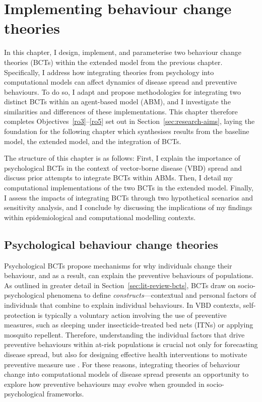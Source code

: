 \section{Implementing behaviour change theories}\label{sec:bcts}

In this chapter, I design, implement, and parameterise two behaviour change theories (BCTs) within the extended model from the previous chapter. Specifically, I address how integrating theories from psychology into computational models can affect dynamics of disease spread and preventive behaviours. To do so, I adapt and propose methodologies for integrating two distinct BCTs within an agent-based model (ABM), and I investigate the similarities and differences of these implementations. This chapter therefore completes Objectives~\ref{ro3}--\ref{ro5} set out in Section~\ref{sec:research-aims}, laying the foundation for the following chapter which synthesises results from the baseline model, the extended model, and the integration of BCTs.

The structure of this chapter is as follows: First, I explain the importance of psychological BCTs in the context of vector-borne disease (VBD) spread and discuss prior attempts to integrate BCTs within ABMs. Then, I detail my computational implementations of the two BCTs in the extended model. Finally, I assess the impacts of integrating BCTs through two hypothetical scenarios and sensitivity analysis, and I conclude by discussing the implications of my findings within epidemiological and computational modelling contexts.

\subsection{Psychological behaviour change theories}

Psychological BCTs propose mechanisms for why individuals change their behaviour, and as a result, can explain the preventive behaviours of populations. As outlined in greater detail in Section~\ref{sec:lit-review-bcts}, BCTs draw on socio-psychological phenomena to define \textit{constructs}---contextual and personal factors of individuals that combine to explain individual behaviours. In VBD contexts, self-protection is typically a voluntary action involving the use of preventive measures, such as sleeping under insecticide-treated bed nets (ITNs) or applying mosquito repellent. Therefore, understanding the individual factors that drive preventive behaviours within at-risk populations is crucial not only for forecasting disease spread, but also for designing effective health interventions to motivate preventive measure use \cite{vande_velde_integrated_2024}. For these reasons, integrating theories of behaviour change into computational models of disease spread presents an opportunity to explore how preventive behaviours may evolve when grounded in socio-psychological frameworks.


